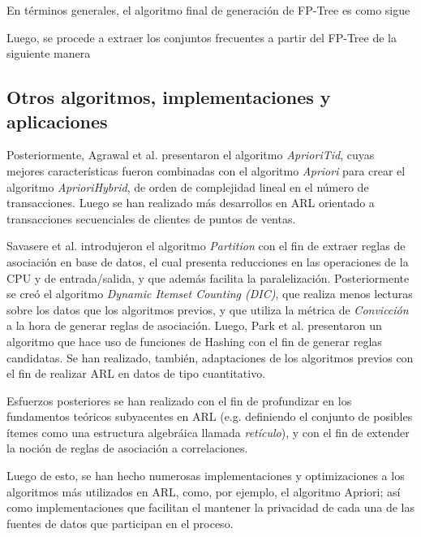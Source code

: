 
En términos generales, el algoritmo final de generación de FP-Tree es como sigue


Luego, se procede a extraer los conjuntos frecuentes a partir del FP-Tree de la siguiente manera

\subsection{Otros algoritmos, implementaciones y aplicaciones}

Posteriormente, Agrawal et al. presentaron el algoritmo \textit{AprioriTid}, cuyas mejores características fueron combinadas con el algoritmo \textit{Apriori} para crear el algoritmo \textit{AprioriHybrid}, de orden de complejidad lineal en el número de transacciones\cite{agrawal1994fast}. Luego se han realizado más desarrollos en ARL orientado a transacciones secuenciales de clientes de puntos de ventas\cite{agrawal1995mining}.

Savasere et al. introdujeron el algoritmo \textit{Partition}\cite{savasere1995efficient} con el fin de extraer reglas de asociación en base de datos, el cual presenta reducciones en las operaciones de la CPU y de entrada/salida, y que además facilita la paralelización. Posteriormente se creó el algoritmo \textit{Dynamic Itemset Counting (DIC)}\cite{brin1997dynamic}, que realiza menos lecturas sobre los datos que los algoritmos previos, y que utiliza la métrica de \textit{Convicción} a la hora de generar reglas de asociación. Luego, Park et al. presentaron un algoritmo que hace uso de funciones de Hashing con el fin de generar reglas candidatas\cite{park1995effective}. Se han realizado, también, adaptaciones de los algoritmos previos con el fin de realizar ARL en datos de tipo cuantitativo\cite{srikant1996mining}.

Esfuerzos posteriores se han realizado con el fin de profundizar en los fundamentos teóricos subyacentes en ARL (e.g. definiendo el conjunto de posibles ítemes como una estructura algebráica llamada \textit{retículo})\cite{zaki1998theoretical}, y con el fin de extender la noción de reglas de asociación a correlaciones\cite{brin1997beyond}.

Luego de esto, se han hecho numerosas implementaciones y optimizaciones a los algoritmos más utilizados en ARL, como, por ejemplo, el algoritmo Apriori\cite{bodon2010fast}; así como implementaciones que facilitan el mantener la privacidad de cada una de las fuentes de datos que participan en el proceso\cite{evfimievski2004privacy}.

